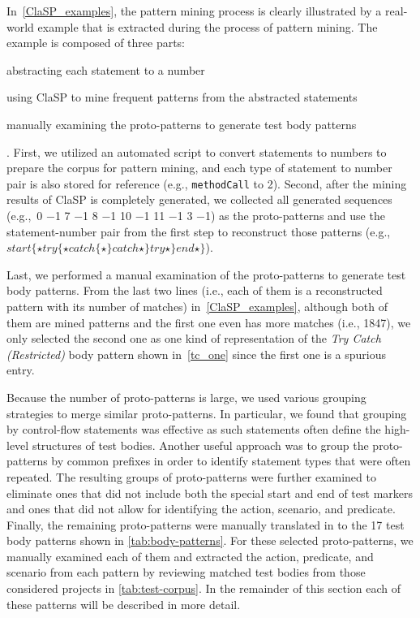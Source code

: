 In~\cref{ClaSP_examples}, the pattern mining process is clearly illustrated by a real-world example that is extracted during the process of pattern mining.
%
The example is composed of three parts:
\begin{enumerate*}
\item abstracting each statement to a number
\item using ClaSP to mine frequent patterns from the abstracted statements
\item manually examining the proto-patterns to generate test body patterns
\end{enumerate*}.
%
First, we utilized an automated script to convert statements to numbers to prepare the corpus for pattern mining, and each type of statement to number pair is also stored for reference (e.g., \texttt{methodCall} to \num{2}).
%
Second, after the mining results of ClaSP is completely generated, we collected all generated sequences (e.g.,~\num{0} \num{-1} \num{7} \num{-1} \num{8} \num{-1} \num{10} \num{-1} \num{11} \num{-1} \num{3} \num{-1}) as the proto-patterns and use the statement-number pair from the first step to reconstruct those patterns (e.g.,~$start\{ \star try\{ \star catch\{ \star \}catch \star \}try \star \}end \star \}$).

Last, we performed a manual examination of the proto-patterns to generate test body patterns.
%
From the last two lines (i.e., each of them is a reconstructed pattern with its number of matches) in~\cref{ClaSP_examples}, although both of them are mined patterns and the first one even has more matches (i.e., \num{1847}), we only selected the second one as one kind of representation of the \textit{Try Catch (Restricted)} body pattern shown in~\cref{tc_one} since the first one is a spurious entry.

Because the number of proto-patterns is large, we used various grouping strategies to merge similar proto-patterns.
%
In particular, we found that grouping by control-flow statements was effective as such statements often define the high-level structures of test bodies.
%
Another useful approach was to group the proto-patterns by common prefixes in order to identify statement types that were often repeated.
%
The resulting groups of proto-patterns were further examined to eliminate ones that did not include both the special start and end of test markers and ones that did not allow for identifying the action, scenario, and predicate.
%
Finally, the remaining proto-patterns were manually translated in to the \num{17} test body patterns shown in \cref{tab:body-patterns}.
For these selected proto-patterns, we manually examined each of them and extracted the action, predicate, and scenario from each pattern by reviewing matched test bodies from those considered projects in \cref{tab:test-corpus}.
%
In the remainder of this section each of these patterns will be described in more detail.


